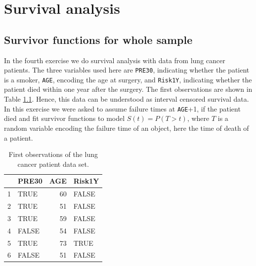 \chapter{Survival analysis}
\section{Survivor functions for whole sample}
In the fourth exercise we do survival analysis with data from lung cancer patients. The three variables used here are \texttt{PRE30}, indicating whether the patient is a smoker, \texttt{AGE}, encoding the age at surgery, and \texttt{Risk1Y}, indicating whether the patient died within one year after the surgery. The first observations are shown in Table \ref{5table}. Hence, this data can be understood as interval censored survival data. In this exercise we were asked to assume failure times at \texttt{AGE}+1, if the patient died and fit survivor functions to model $S(t)=P(T>t)$, where $T$ is a random variable encoding the failure time of an object, here the time of death of a patient. 
\begin{table}[ht]
\centering
\begin{tabular}{llrl}
  \hline
 & PRE30 & AGE & Risk1Y \\ 
  \hline
1 & TRUE &  60 & FALSE \\ 
  2 & TRUE &  51 & FALSE \\ 
  3 & TRUE &  59 & FALSE \\ 
  4 & FALSE &  54 & FALSE \\ 
  5 & TRUE &  73 & TRUE \\ 
  6 & FALSE &  51 & FALSE \\ 
   \hline
\end{tabular}
\caption{First observations of the lung cancer patient data set.}
\label{5table}
\end{table}

